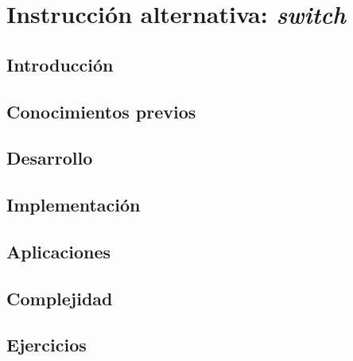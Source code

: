 \chapter{Instrucción alternativa: \emph{switch}}
\section{Introducción}

\section{Conocimientos previos}

\section{Desarrollo}

\section{Implementación}

\section{Aplicaciones}

\section{Complejidad}

\section{Ejercicios}

